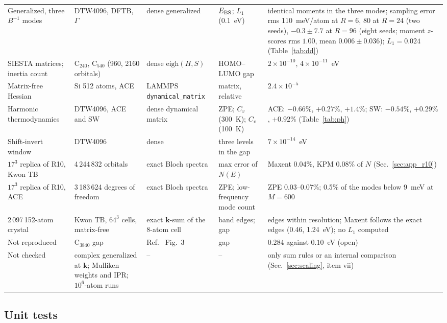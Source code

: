 \documentclass[reprint,nofootinbib,superscriptaddress,amsmath,amssymb,aps,prb,floatfix]{revtex4-2}
\begin{document}
\begin{table}
\begin{ruledtabular}
\begin{tabular}{p{2.9cm}p{3.1cm}p{2.6cm}p{2.9cm}p{4.6cm}}
Generalized, three $B^{-1}$ modes & DTW4096, DFTB, $\Gamma$ & dense generalized & $E_{\rm BS}$; $L_1$ (0.1~eV) & identical moments in the three modes; sampling error rms 110~meV/atom at $R=6$, 80 at $R=24$ (two seeds), $-0.3\pm7.7$ at $R=96$ (eight seeds; moment $z$-scores rms $1.00$, mean $0.006\pm0.036$); $L_1=0.024$ (Table~\ref{tab:dd}) \\
SIESTA matrices; inertia count & C$_{240}$, C$_{540}$ (960, 2160 orbitals) & dense $\mathrm{eigh}(H,S)$ & HOMO--LUMO gap & $2\times10^{-10}$, $4\times10^{-11}$~eV \\
Matrix-free Hessian & Si 512 atoms, ACE & LAMMPS \texttt{dynamical\_matrix} & matrix, relative & $2.4\times10^{-5}$ \\
Harmonic thermodynamics & DTW4096, ACE and SW & dense dynamical matrix & ZPE; $C_v$ (300~K); $C_v$ (100~K) & ACE: $-0.66\%$, $+0.27\%$, $+1.4\%$; SW: $-0.54\%$, $+0.29\%$, $+0.92\%$ (Table~\ref{tab:ph}) \\
Shift-invert window & DTW4096 & dense & three levels in the gap & $7\times10^{-14}$~eV \\
$17^3$ replica of R10, Kwon TB & 4\,244\,832 orbitals & exact Bloch spectra & max error of $N(E)$ & Maxent 0.04\%, KPM 0.08\% of $N$ (Sec.~\ref{sec:app_r10}) \\
$17^3$ replica of R10, ACE & 3\,183\,624 degrees of freedom & exact Bloch spectra & ZPE; low-frequency mode count & ZPE 0.03--0.07\%; 0.5\% of the modes below 9~meV at $M=600$ \\
2\,097\,152-atom crystal & Kwon TB, $64^3$ cells, matrix-free & exact $\mathbf k$-sum of the 8-atom cell & band edges; gap & edges within resolution; Maxent follows the exact edges (0.46, 1.24~eV); no $L_1$ computed \\
\colrule
Not reproduced & C$_{3840}$ gap & Ref.~\cite{ssc96} Fig.~3 & gap & $0.284$ against $0.10$~eV (open) \\
Not checked & complex generalized at $\mathbf k$; Mulliken weights and IPR; $10^6$-atom runs & -- & -- & only sum rules or an internal comparison (Sec.~\ref{sec:scaling}, item vii) \\
\end{tabular}
\end{ruledtabular}
\end{table}

\subsection{Unit tests}
\end{document}
